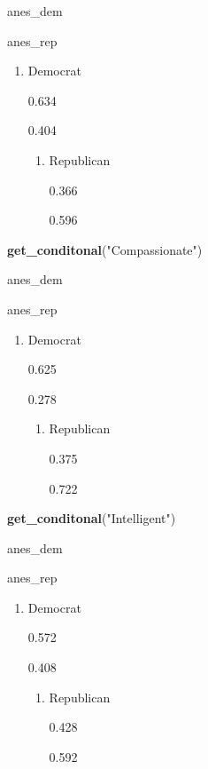 \documentclass[
]{article}
\newenvironment{Shaded}{\begin{snugshade}}{\end{snugshade}}
\newcommand{\KeywordTok}[1]{\textcolor[rgb]{0.13,0.29,0.53}{\textbf{#1}}}
\newcommand{\NormalTok}[1]{#1}
\newcommand{\StringTok}[1]{\textcolor[rgb]{0.31,0.60,0.02}{#1}}
\providecommand{\tightlist}{%
  \setlength{\itemsep}{0pt}\setlength{\parskip}{0pt}}
\begin{document}
anes\_dem

anes\_rep

\begin{enumerate}
\def\labelenumi{\arabic{enumi}.}
\tightlist
\item
  Democrat

  {0.634}

  {0.404}

  \begin{enumerate}
  \def\labelenumii{\arabic{enumii}.}
  \setcounter{enumii}{1}
  \tightlist
  \item
    Republican

    {0.366}

    {0.596}
  \end{enumerate}
\end{enumerate}

\begin{Shaded}
\begin{Highlighting}[]
\KeywordTok{get_conditonal}\NormalTok{(}\StringTok{"Compassionate"}\NormalTok{)}
\end{Highlighting}
\end{Shaded}

anes\_dem

anes\_rep

\begin{enumerate}
\def\labelenumi{\arabic{enumi}.}
\tightlist
\item
  Democrat

  {0.625}

  {0.278}

  \begin{enumerate}
  \def\labelenumii{\arabic{enumii}.}
  \setcounter{enumii}{1}
  \tightlist
  \item
    Republican

    {0.375}

    {0.722}
  \end{enumerate}
\end{enumerate}

\begin{Shaded}
\begin{Highlighting}[]
\KeywordTok{get_conditonal}\NormalTok{(}\StringTok{"Intelligent"}\NormalTok{)}
\end{Highlighting}
\end{Shaded}

anes\_dem

anes\_rep

\begin{enumerate}
\def\labelenumi{\arabic{enumi}.}
\tightlist
\item
  Democrat

  {0.572}

  {0.408}

  \begin{enumerate}
  \def\labelenumii{\arabic{enumii}.}
  \setcounter{enumii}{1}
  \tightlist
  \item
    Republican

    {0.428}

    {0.592}
  \end{enumerate}
\end{enumerate}
\end{document}
